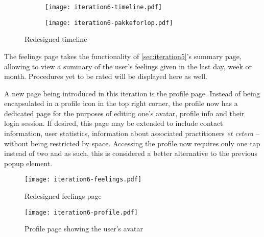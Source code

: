 \begin{sidewaysfigure}
    \centering
    \hspace{\fill}
    \begin{subfigure}[t]{0.35\textwidth}
        \centering
        \vspace{0pt}
        \texttt{[image: iteration6-timeline.pdf]}
        \label{fig:i6-timeline-zoomin}
    \end{subfigure}
    \hspace{\fill}
    \begin{subfigure}[t]{0.35\textwidth}
        \centering
        \vspace{0pt}
        \texttt{[image: iteration6-pakkeforlop.pdf]}
        \label{fig:i6-timeline-zoomout}
    \end{subfigure}
    \hspace*{\fill}
    \caption{Redesigned timeline}
    \label{fig:i6-timeline}
\end{sidewaysfigure}

The feelings page takes the functionality of \autoref{sec:iteration5}'s summary page, allowing to view a summary of the user's feelings given in the last day, week or month. Procedures yet to be rated will be displayed here as well.

A new page being introduced in this iteration is the profile page. Instead of being encapsulated in a profile icon in the top right corner, the profile now has a dedicated page for the purposes of editing one's avatar, profile info and their login session. If desired, this page may be extended to include contact information, user statistics, information about associated practitioners \emph{et cetera} -- without being restricted by space. Accessing the profile now requires only one tap instead of two and as such, this is considered a better alternative to the previous popup element.

\begin{sidewaysfigure}
    \centering
    \hspace{\fill}
    \begin{minipage}[t]{0.4\textwidth}
        \centering
        \vspace{0pt}
        \texttt{[image: iteration6-feelings.pdf]}
        \caption{Redesigned feelings page}
        \label{fig:i6-feelings}
    \end{minipage}
    \hspace{\fill}
    \begin{minipage}[t]{0.4\textwidth}
        \centering
        \vspace{0pt}
        \texttt{[image: iteration6-profile.pdf]}
        \caption{Profile page showing the user's avatar}
        \label{fig:i6-profile}
    \end{minipage}
    \hspace*{\fill}
\end{sidewaysfigure}

